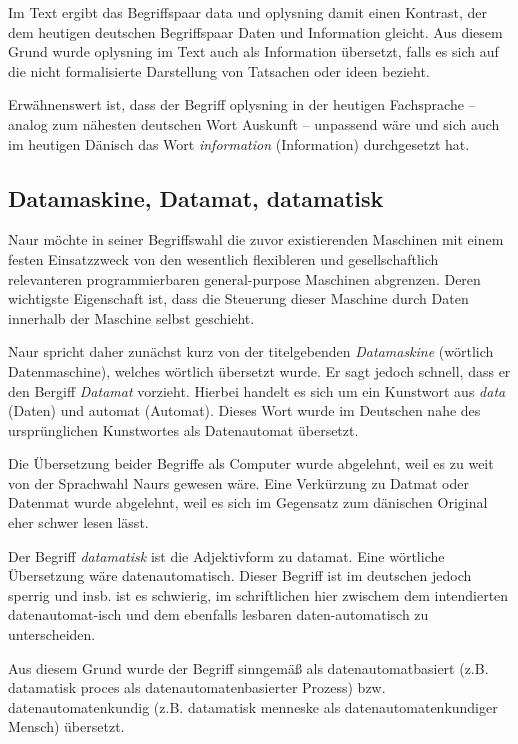     Im Text ergibt das Begriffspaar data und oplysning damit einen Kontrast, der dem heutigen deutschen Begriffspaar Daten und Information gleicht. Aus diesem Grund wurde oplysning im Text auch als Information übersetzt, falls es sich auf die nicht formalisierte Darstellung von Tatsachen oder ideen bezieht.
    
    Erwähnenswert ist, dass der Begriff oplysning in der heutigen Fachsprache -- analog zum nähesten deutschen Wort Auskunft -- unpassend wäre und sich auch im heutigen Dänisch das Wort \emph{information} (Information) durchgesetzt hat. 
    
\subsection{Datamaskine, Datamat, datamatisk}

    Naur möchte in seiner Begriffswahl die zuvor existierenden Maschinen mit einem festen Einsatzzweck von den wesentlich flexibleren und gesellschaftlich relevanteren programmierbaren general-purpose Maschinen abgrenzen. Deren wichtigste Eigenschaft ist, dass die Steuerung dieser Maschine durch Daten innerhalb der Maschine selbst geschieht. 

    Naur spricht daher zunächst kurz von der titelgebenden \emph{Datamaskine} (wörtlich Datenmaschine), welches wörtlich übersetzt wurde. Er sagt jedoch schnell, dass er den Bergiff \emph{Datamat} vorzieht. Hierbei handelt es sich um ein Kunstwort aus \emph{data} (Daten) und {automat} (Automat). Dieses Wort wurde im Deutschen nahe des ursprünglichen Kunstwortes als Datenautomat übersetzt.
    
    Die Übersetzung beider Begriffe als Computer wurde abgelehnt, weil es zu weit von der Sprachwahl Naurs gewesen wäre. Eine Verkürzung zu Datmat oder Datenmat wurde abgelehnt, weil es sich im Gegensatz zum dänischen Original eher schwer lesen lässt. 

    Der Begriff \emph{datamatisk} ist die Adjektivform zu datamat. Eine wörtliche Übersetzung wäre datenautomatisch. Dieser Begriff ist im deutschen jedoch sperrig und insb. ist es schwierig, im schriftlichen hier zwischem dem intendierten datenautomat-isch und dem ebenfalls lesbaren daten-automatisch zu unterscheiden.
    
    Aus diesem Grund wurde der Begriff sinngemäß als datenautomatbasiert (z.B. datamatisk proces als datenautomatenbasierter Prozess) bzw. datenautomatenkundig (z.B. datamatisk menneske als datenautomatenkundiger Mensch) übersetzt. 
    
